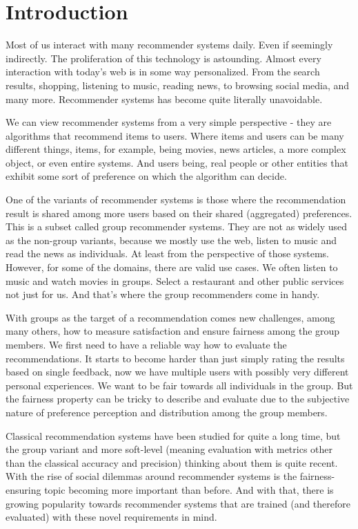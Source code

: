 \chapter{Introduction}  \label{chap_introduction}






Most of us interact with many recommender systems daily. Even if seemingly indirectly. The proliferation of this technology is astounding. Almost every interaction with today's web is in some way personalized. From the search results, shopping, listening to music, reading news, to browsing social media, and many more. Recommender systems has become quite literally unavoidable.

We can view recommender systems from a very simple perspective - they are algorithms that recommend items to users. Where items and users can be many different things, items, for example, being movies, news articles, a more complex object, or even entire systems. And users being, real people or other entities that exhibit some sort of preference on which the algorithm can decide.

One of the variants of recommender systems is those where the recommendation result is shared among more users based on their shared (aggregated) preferences. This is a subset called group recommender systems. They are not as widely used as the non-group variants, because we mostly use the web, listen to music and read the news as individuals. At least from the perspective of those systems. However, for some of the domains, there are valid use cases. We often listen to music and watch movies in groups. Select a restaurant and other public services not just for us. And that's where the group recommenders come in handy.

With groups as the target of a recommendation comes new challenges, among many others, how to measure satisfaction and ensure fairness among the group members. We first need to have a reliable way how to evaluate the recommendations. It starts to become harder than just simply rating the results based on single feedback, now we have multiple users with possibly very different personal experiences. We want to be fair towards all individuals in the group. But the fairness property can be tricky to describe and evaluate due to the subjective nature of preference perception and distribution among the group members.

Classical recommendation systems have been studied for quite a long time, but the group variant and more soft-level (meaning evaluation with metrics other than the classical accuracy and precision) thinking about them is quite recent. With the rise of social dilemmas around recommender systems is the fairness-ensuring topic becoming more important than before. And with that, there is growing popularity towards recommender systems that are trained (and therefore evaluated) with these novel requirements in mind.



